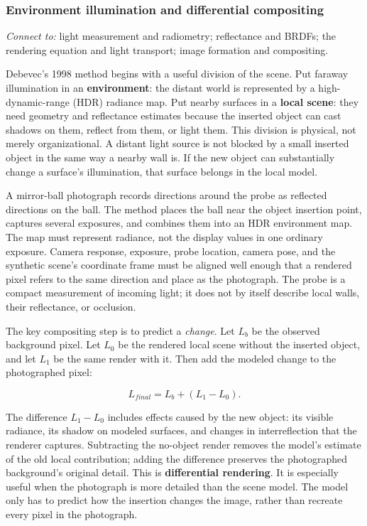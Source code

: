 \subsubsection{Environment illumination and differential compositing}\label{environment-illumination-and-differential-compositing}

\emph{Connect to:} light measurement and radiometry; reflectance and BRDFs; the rendering equation and light transport; image formation and compositing.

Debevec's 1998 method begins with a useful division of the scene. Put faraway illumination in an \textbf{environment}: the distant world is represented by a high-dynamic-range (HDR) radiance map. Put nearby surfaces in a \textbf{local scene}: they need geometry and reflectance estimates because the inserted object can cast shadows on them, reflect from them, or light them. This division is physical, not merely organizational. A distant light source is not blocked by a small inserted object in the same way a nearby wall is. If the new object can substantially change a surface's illumination, that surface belongs in the local model.

A mirror-ball photograph records directions around the probe as reflected directions on the ball. The method places the ball near the object insertion point, captures several exposures, and combines them into an HDR environment map. The map must represent radiance, not the display values in one ordinary exposure. Camera response, exposure, probe location, camera pose, and the synthetic scene's coordinate frame must be aligned well enough that a rendered pixel refers to the same direction and place as the photograph. The probe is a compact measurement of incoming light; it does not by itself describe local walls, their reflectance, or occlusion.

The key compositing step is to predict a \emph{change}. Let \(L_b\) be the observed background pixel. Let \(L_0\) be the rendered local scene without the inserted object, and let \(L_1\) be the same render with it. Then add the modeled change to the photographed pixel:

\[L_{final}=L_b+(L_1-L_0).\]

The difference \(L_1-L_0\) includes effects caused by the new object: its visible radiance, its shadow on modeled surfaces, and changes in interreflection that the renderer captures. Subtracting the no-object render removes the model's estimate of the old local contribution; adding the difference preserves the photographed background's original detail. This is \textbf{differential rendering}. It is especially useful when the photograph is more detailed than the scene model. The model only has to predict how the insertion changes the image, rather than recreate every pixel in the photograph.

